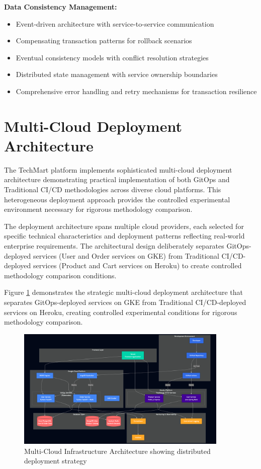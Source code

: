 \textbf{Data Consistency Management:}
\begin{itemize}
\item Event-driven architecture with service-to-service communication
\item Compensating transaction patterns for rollback scenarios
\item Eventual consistency models with conflict resolution strategies
\item Distributed state management with service ownership boundaries
\item Comprehensive error handling and retry mechanisms for transaction resilience
\end{itemize}

\section{Multi-Cloud Deployment Architecture}

The TechMart platform implements sophisticated multi-cloud deployment architecture demonstrating practical implementation of both GitOps and Traditional CI/CD methodologies across diverse cloud platforms. This heterogeneous deployment approach provides the controlled experimental environment necessary for rigorous methodology comparison.

The deployment architecture spans multiple cloud providers, each selected for specific technical characteristics and deployment patterns reflecting real-world enterprise requirements. The architectural design deliberately separates GitOps-deployed services (User and Order services on GKE) from Traditional CI/CD-deployed services (Product and Cart services on Heroku) to create controlled methodology comparison conditions.

Figure \ref{fig:multi-cloud-infrastructure} demonstrates the strategic multi-cloud deployment architecture that separates GitOps-deployed services on GKE from Traditional CI/CD-deployed services on Heroku, creating controlled experimental conditions for rigorous methodology comparison.

\begin{figure}[H]
\centering
\includegraphics[width=0.9\textwidth]{figures/chapter4/multi-cloud-infrastructure.png}
\caption{Multi-Cloud Infrastructure Architecture showing distributed deployment strategy}
\label{fig:multi-cloud-infrastructure}
\end{figure}

